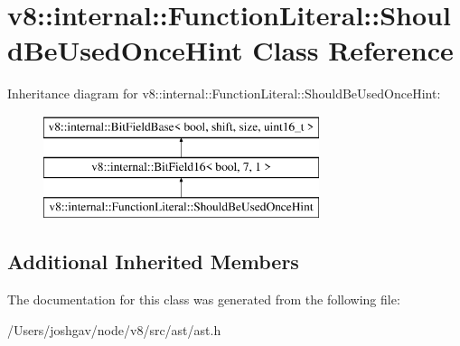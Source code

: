 \hypertarget{classv8_1_1internal_1_1_function_literal_1_1_should_be_used_once_hint}{}\section{v8\+:\+:internal\+:\+:Function\+Literal\+:\+:Should\+Be\+Used\+Once\+Hint Class Reference}
\label{classv8_1_1internal_1_1_function_literal_1_1_should_be_used_once_hint}
Inheritance diagram for v8\+:\+:internal\+:\+:Function\+Literal\+:\+:Should\+Be\+Used\+Once\+Hint\+:\begin{figure}[H]
\begin{center}
\leavevmode
\includegraphics[height=3.000000cm]{classv8_1_1internal_1_1_function_literal_1_1_should_be_used_once_hint}
\end{center}
\end{figure}
\subsection*{Additional Inherited Members}


The documentation for this class was generated from the following file\+:\begin{DoxyCompactItemize}
\item 
/\+Users/joshgav/node/v8/src/ast/ast.\+h\end{DoxyCompactItemize}
